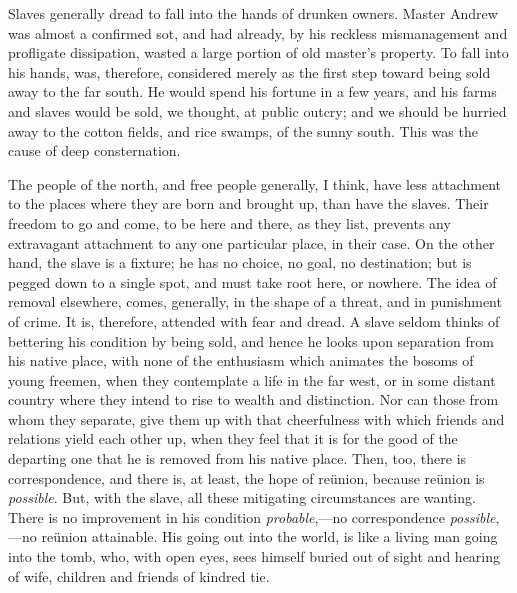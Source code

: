 Slaves generally dread to fall into the hands of drunken owners. Master
Andrew was almost a confirmed sot, and had already, by his reckless
mismanagement and profligate dissipation, wasted a large portion of old
master's property. To fall into his hands, was, therefore, considered
merely as the first step toward being sold away to the far south. He
would spend his fortune in a few years, and his farms and slaves would
be sold, we thought, at public outcry; and we should be hurried away to
the cotton fields, and rice swamps, of the sunny south. This was the
cause of deep consternation.

The people of the north, and free people generally, I think, have less
attachment to the places where they are born and brought up, than have
the slaves. Their freedom to go and come, to be here and there, as they
list, prevents any extravagant attachment to any one particular place,
in their case. On the other hand, the slave is a fixture; he has no
choice, no goal, no destination; but is pegged down to a single spot,
and must take root here, or nowhere. The idea of removal elsewhere,
comes, generally, in the shape of a threat, and in punishment of crime.
It is, therefore, attended with fear and dread. A slave seldom thinks of
bettering his condition by being sold, and hence he looks upon
separation from his native place, with
{\protect\hypertarget{177}{}{}}none of the enthusiasm which animates the
bosoms of young freemen, when they contemplate a life in the far west,
or in some distant country where they intend to rise to wealth and
distinction. Nor can those from whom they separate, give them up with
that cheerfulness with which friends and relations yield each other up,
when they feel that it is for the good of the departing one that he is
removed from his native place. Then, too, there is correspondence, and
there is, at least, the hope of reünion, because reünion is
\emph{possible}. But, with the slave, all these mitigating circumstances
are wanting. There is no improvement in his condition
\emph{probable},---no correspondence \emph{possible},---no reünion
attainable. His going out into the world, is like a living man going
into the tomb, who, with open eyes, sees himself buried out of sight and
hearing of wife, children and friends of kindred tie.

